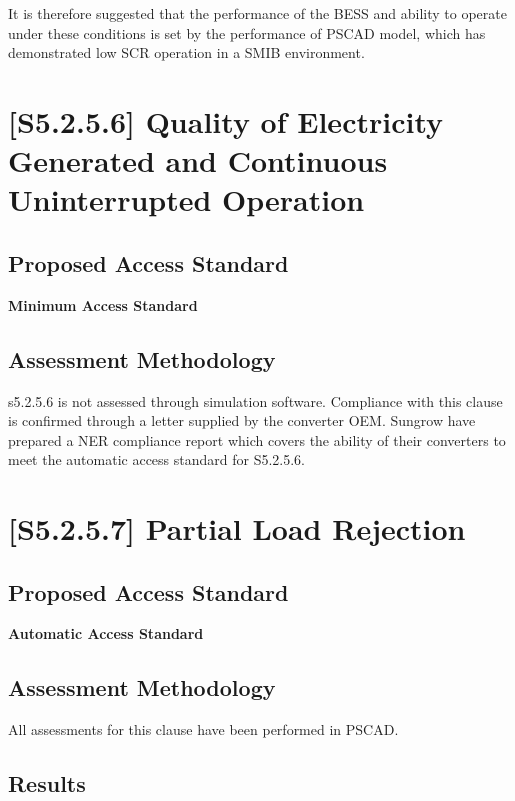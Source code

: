 \documentclass{../grid-link-report}
\newcommand{\projectassetsdir}{../project-assets}
\begin{document}
		It is therefore suggested that the performance of the BESS and ability to operate under these conditions is set by the performance of PSCAD model, which has demonstrated low SCR operation in a SMIB environment.

			
	\section{[S5.2.5.6] Quality of Electricity Generated and Continuous Uninterrupted Operation}
	\subsection{Proposed Access Standard}
	\textbf{Minimum Access Standard}
		\begin{tcolorbox}[lightgreenbox]
			
		\end{tcolorbox}
	\subsection{Assessment Methodology}
		s5.2.5.6 is not assessed through simulation software. Compliance with this clause is confirmed through a letter supplied by the converter OEM. Sungrow have prepared a NER compliance report which covers the ability of their converters to meet the automatic access standard for S5.2.5.6.\cite{sungrow-s5256-compliance-letter}
	
	\section{[S5.2.5.7] Partial Load Rejection}
	\subsection{Proposed Access Standard}
	\textbf{Automatic Access Standard}
		\begin{tcolorbox}[lightgreenbox]
			
		\end{tcolorbox}
	\subsection{Assessment Methodology}
		
		
		All assessments for this clause have been performed in PSCAD.
		
	\subsection{Results}
	
\end{document}
